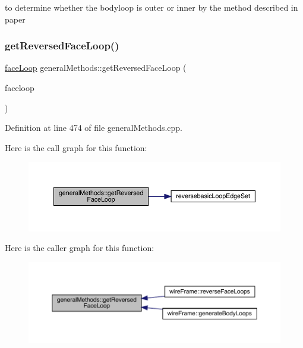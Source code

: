 to determine whether the bodyloop is outer or inner by the method described in paper \mbox{\label{namespacegeneral_methods_afe4087e253b318326a0a1578d34b42ca}} 
\subsubsection{\texorpdfstring{get\+Reversed\+Face\+Loop()}{getReversedFaceLoop()}}
{\footnotesize\ttfamily \mbox{\hyperlink{classface_loop}{face\+Loop}} general\+Methods\+::get\+Reversed\+Face\+Loop (\begin{DoxyParamCaption}\item[{\mbox{\hyperlink{classface_loop}{face\+Loop}}}]{faceloop }\end{DoxyParamCaption})}



Definition at line 474 of file general\+Methods.\+cpp.

Here is the call graph for this function\+:
\nopagebreak
\begin{figure}[H]
\begin{center}
\leavevmode
\includegraphics[width=350pt]{namespacegeneral_methods_afe4087e253b318326a0a1578d34b42ca_cgraph}
\end{center}
\end{figure}
Here is the caller graph for this function\+:
\nopagebreak
\begin{figure}[H]
\begin{center}
\leavevmode
\includegraphics[width=350pt]{namespacegeneral_methods_afe4087e253b318326a0a1578d34b42ca_icgraph}
\end{center}
\end{figure}
\mbox{\label{namespacegeneral_methods_a21d2e8c181e8cac3762d9ca1871d2168}} 
